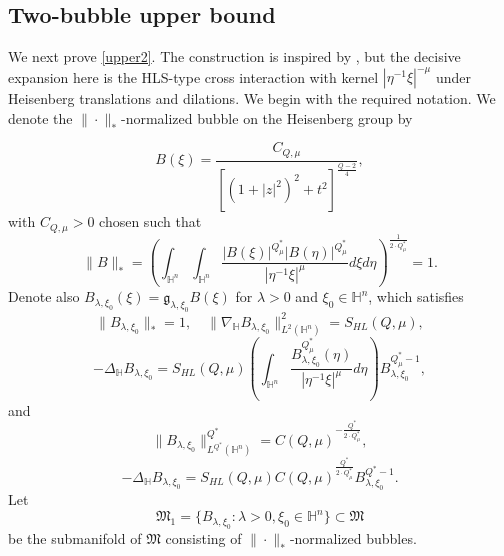 \documentclass[10pt,a4paper]{amsart}
\begin{document}
\endgroup



\subsection{Two-bubble upper bound}
We next prove \eqref{upper2}. The construction is inspired by \cite{K25}, but the decisive expansion here is the HLS-type cross interaction with kernel $|\eta^{-1}\xi|^{-\mu}$ under Heisenberg translations and dilations. We begin with the required notation. We denote the $\|\cdot\|_*$-normalized bubble on the Heisenberg group by


\begin{equation*}
 B(\xi)=\frac{C_{Q,\mu}}{[(1+|z|^{2})^{2}+t^{2}]^{\frac{Q-2}{4}}},
\end{equation*}
with $C_{Q,\mu}>0$ chosen such that
\begin{equation*}
\|B\|_*= \left(\int_{\mathbb{H}^{n}}\int_{\mathbb{H}^{n}}\frac{|B(\xi)|^{Q^{\ast}_{\mu}} |B(\eta)|
^{Q^{\ast}_{\mu}}}{|\eta^{-1}\xi|^{\mu}}{d}\xi{d}\eta\right)^{\frac{1}{2\cdot Q^{\ast}_{\mu}}}=1.
\end{equation*}
Denote also $B_{\lambda,\xi_0}(\xi)=\mathfrak{g}_{\lambda,\xi_0}B(\xi)$ for $\lambda>0$ and $\xi_0\in \mathbb{H}^n$, which satisfies
\begin{equation*}
 \|B_{\lambda,\xi_0}\|_*=1,\quad \|\nabla_\mathbb{H}B_{\lambda,\xi_0}\|_{{L}^{2}(\mathbb{H}^n)}^2=S_{HL}(Q,\mu),
\end{equation*}
\begin{equation}\label{ne1}
 -\Delta_{\mathbb{H}} B_{\lambda,\xi_0}=S_{HL}(Q,\mu)\left(\int_{\mathbb{H}^{n}}\frac{B_{\lambda,\xi_0}
^{Q^{\ast}_{\mu}}(\eta)}{|\eta^{-1}\xi|^{\mu}}{d}\eta\right)B_{\lambda,\xi_0}^{Q^{\ast}_{\mu}-1},
\end{equation}
and
\begin{equation*}
 \|B_{\lambda,\xi_0}\|^{Q^{\ast}}_{L^{Q^{\ast}}(\mathbb{H}^{n})}=C(Q,\mu)^{-\frac{Q^{\ast}}{2\cdot Q^{\ast}_{\mu}}},
\end{equation*}
\begin{equation}\label{ne2}
 -\Delta_{\mathbb{H}} B_{\lambda,\xi_0}=S_{HL}(Q,\mu)C(Q,\mu)^{\frac{Q^{\ast}}{2\cdot Q^{\ast}_{\mu}}}B_{\lambda,\xi_0}^{Q^{\ast}-1}.
\end{equation}
Let
\begin{equation*}
 \mathfrak{M}_1=\{B_{\lambda,\xi_0}:\lambda>0,\xi_0\in \mathbb{H}^n\}\subset \mathfrak{M}
\end{equation*}
be the submanifold of $\mathfrak{M}$ consisting of $\|\cdot\|_*$-normalized bubbles.
\end{document}
